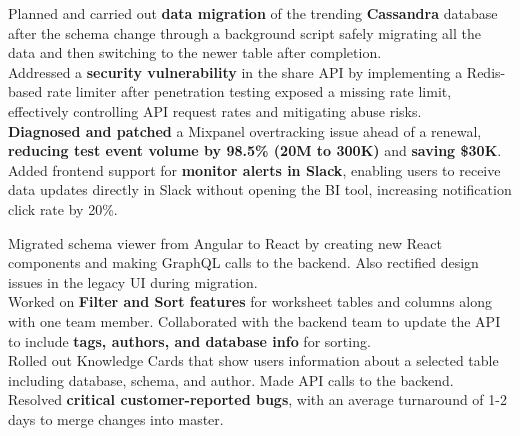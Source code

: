 \documentclass[]{Nikhil_Kadiyan_Resume}
\begin{document}
\pt Planned and carried out \textbf{data migration} of the trending \textbf{Cassandra} database after the schema change through a background script safely migrating all the data and then switching to the newer table after completion.\\
\pt Addressed a \textbf{security vulnerability} in the share API by implementing a Redis-based rate limiter after penetration testing exposed a missing rate limit, effectively controlling API request rates and mitigating abuse risks.\\
\pt \textbf{Diagnosed and patched} a Mixpanel overtracking issue ahead of a renewal, \textbf{reducing test event volume by 98.5\% (20M to 300K)} and \textbf{saving \$30K}.\\ %
\pt Added frontend support for \textbf{monitor alerts in Slack}, enabling users to receive data updates directly in Slack without opening the BI tool, increasing notification click rate by 20\%.\\
\sectionsep

\pt Migrated schema viewer from Angular to React by creating new React components and making GraphQL calls to the backend. Also rectified design issues in the legacy UI during migration.\\
\pt Worked on \textbf{Filter and Sort features} for worksheet tables and columns along with one team member. Collaborated with the backend team to update the API to include \textbf{tags, authors, and database info} for sorting.\\
\pt Rolled out Knowledge Cards that show users information about a selected table including database, schema, and author. Made API calls to the backend.\\
\pt Resolved \textbf{critical customer-reported bugs}, with an average turnaround of 1-2 days to merge changes into master.\\
\sectionsep
\end{document}
